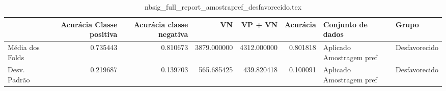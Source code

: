 \begin{table}
\centering
\caption{nbsig_full_report_amostrapref_desfavorecido.tex}
\label{nbsig_full_report_amostrapref_desfavorecido.tex}
\begin{tabular}{lrrrrrll}
\toprule
{}              &  Acurácia Classe positiva &  Acurácia classe negativa &          VN  &     VP + VN  &  Acurácia &         Conjunto de dados &          Grupo \\
\midrule
Média dos Folds &                  0.735443 &                  0.810673 &  3879.000000 &  4312.000000 &  0.801818 &  Aplicado Amostragem pref &  Desfavorecido \\
Desv. Padrão    &                  0.219687 &                  0.139703 &   565.685425 &   439.820418 &  0.100091 &  Aplicado Amostragem pref &  Desfavorecido \\
\bottomrule
\end{tabular}
\end{table}
